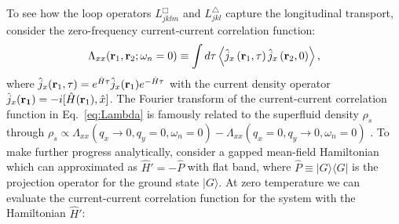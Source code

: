 \documentclass[amsmath,amssymb, aps, prx, longbibliography, twocolumn]{revtex4-1}
\begin{document}
To see how the loop operators $L^\Box_{jklm}$ and $ L^\triangle_{jkl}$ capture the longitudinal transport, consider the zero-frequency current-current correlation function:  
\begin{equation}
\Lambda_{xx}({\bf r}_1,{\bf r}_2;\omega_n=0)\equiv\int d\tau\left\langle \hat{j}_x\left({\bf r}_1, \tau \right) \hat{j}_x\left({\bf r}_2, 0 \right)\right\rangle,
\label{eq:Lambda}
\end{equation}
where $\hat{j}_x({\bf r}_1,\tau)=e^{\hat{H}\tau} \hat{j}_x({\bf r}_1) e^{-\hat{H}\tau}$ with the current density operator $\hat{j}_x({\bf r_1})= -i[\hat{H}({\bf r}_1),\hat{x}]$. The Fourier transform of the 
current-current correlation function in Eq.~\eqref{eq:Lambda} is famously related to the superfluid density $\rho_s$ through $\rho_s\propto \Lambda_{xx}(q_x\!\rightarrow\! 0,q_y\!=\!0,\omega_n\!=\!0)-\Lambda_{xx}(q_x\!=\!0,q_y\!\rightarrow\!0,\omega_n\!=\!0)$ \cite{Scalapino1993, Scalapino1992}. 
To make further progress analytically, consider 
a gapped mean-field Hamiltonian which can approximated as $\hat{H}'=-\hat{P}$ with flat band, where
$\hat{P}\equiv |G\rangle \langle G|$ is the projection operator for the ground state $|G\rangle$. At zero temperature we can evaluate the current-current correlation function for the system with the Hamiltonian $\hat{H}'$:
\end{document}
